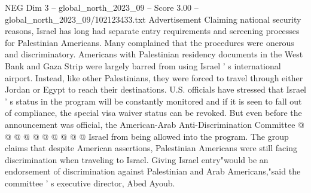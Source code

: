 \begin{textsample}{NEG Dim 3 – global\_north\_2023\_09 – Score 3.00 – global\_north\_2023\_09/102123433.txt}
Advertisement Claiming national security reasons, Israel has long had separate entry requirements and screening processes for Palestinian Americans.
Many complained that the procedures were onerous and discriminatory.
Americans with Palestinian residency documents in the West Bank and Gaza Strip were largely barred from using Israel ' s international airport.
Instead, like other Palestinians, they were forced to travel through either Jordan or Egypt to reach their destinations.
U.S. officials have stressed that Israel ' s status in the program will be constantly monitored and if it is seen to fall out of compliance, the special visa waiver status can be revoked.
But even before the announcement was official, the American-Arab Anti-Discrimination Committee @ @ @ @ @ @ @ @ @ @ Israel from being allowed into the program.
The group claims that despite American assertions, Palestinian Americans were still facing discrimination when traveling to Israel.
Giving Israel entry"would be an endorsement of discrimination against Palestinian and Arab Americans,"said the committee ' s executive director, Abed Ayoub.

\end{textsample}
